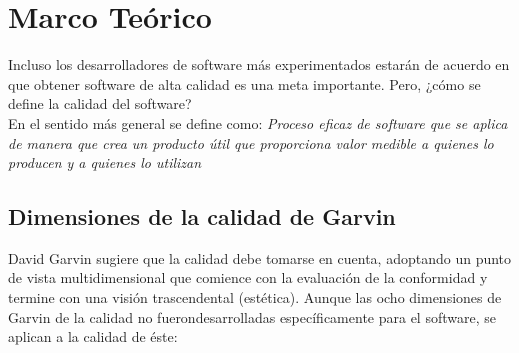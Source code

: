 \chapter{Marco Teórico}
\noindent
Incluso los desarrolladores de software más experimentados estarán de acuerdo en que obtener software de alta calidad es una meta importante. Pero, ¿cómo se define la calidad del software?
\vspace*{.2cm}\\
\noindent
En el sentido más general se define como: \textit{Proceso eficaz de software que se aplica de manera que crea un producto útil que proporciona valor medible a quienes lo producen y a quienes lo utilizan}
\section{Dimensiones de la calidad de Garvin}
\noindent
David Garvin sugiere que la calidad debe tomarse en cuenta, adoptando un punto de vista multidimensional que comience con la evaluación de la conformidad y termine con una visión trascendental (estética). Aunque las ocho dimensiones de Garvin de la calidad no fuerondesarrolladas específicamente para el software, se aplican a la calidad de éste:\\

